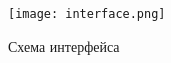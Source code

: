 \begin{figure}[h!]
    \centering
    \texttt{[image: interface.png]}
    \caption{Схема интерфейса}
\end{figure}
